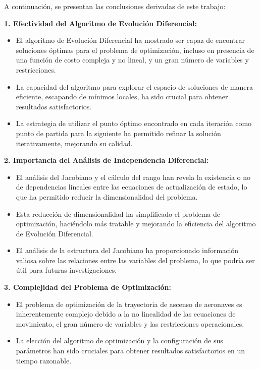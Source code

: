 \documentclass[fleqn]{article}
\begin{document}
A continuación, se presentan las conclusiones derivadas de este trabajo:

\vspace{0.5cm}

\textbf{1. Efectividad del Algoritmo de Evolución Diferencial:}

\begin{itemize}
    \item El algoritmo de Evolución Diferencial ha mostrado ser capaz de encontrar soluciones óptimas para el problema de optimización, incluso en presencia de una función de costo compleja y no lineal, y un gran número de variables y restricciones.
    \item La capacidad del algoritmo para explorar el espacio de soluciones de manera eficiente, escapando de mínimos locales, ha sido crucial para obtener resultados satisfactorios.
    \item La estrategia de utilizar el punto óptimo encontrado en cada iteración como punto de partida para la siguiente ha permitido refinar la solución iterativamente, mejorando su calidad.
\end{itemize}

\textbf{2. Importancia del Análisis de Independencia Diferencial:}

\begin{itemize}
    \item El análisis del Jacobiano y el cálculo del rango han revela la existencia o no de dependencias lineales entre las ecuaciones de actualización de estado, lo que ha permitido reducir la dimensionalidad del problema.
    \item Esta reducción de dimensionalidad ha simplificado el problema de optimización, haciéndolo más tratable y mejorando la eficiencia del algoritmo de Evolución Diferencial.
    \item El análisis de la estructura del Jacobiano ha proporcionado información valiosa sobre las relaciones entre las variables del problema, lo que podría ser útil para futuras investigaciones.
\end{itemize}

\textbf{3. Complejidad del Problema de Optimización:}

\begin{itemize}
    \item El problema de optimización de la trayectoria de ascenso de aeronaves es inherentemente complejo debido a la no linealidad de las ecuaciones de movimiento, el gran número de variables y las restricciones operacionales.
    \item La elección del algoritmo de optimización y la configuración de sus parámetros han sido cruciales para obtener resultados satisfactorios en un tiempo razonable.
\end{itemize}
\end{document}
